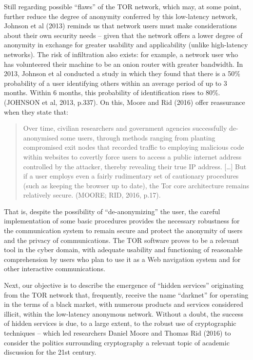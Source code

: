 Still regarding possible ``flaws'' of the TOR network, which may, at some point, further reduce the degree of anonymity conferred by this low-latency network, Johnson et al (2013) reminds us that network users must make considerations about their own security needs -- given that the network offers a lower degree of anonymity in exchange for greater usability and applicability (unlike high-latency networks). The risk of infiltration also exists: for example, a network user who has volunteered their machine to be an onion router with greater bandwidth. In 2013, Johnson et al conducted a study in which they found that there is a 50\% probability of a user identifying others within an average period of up to 3 months. Within 6 months, this probability of identification rises to 80\%. (JOHNSON et al, 2013, p.337). On this, Moore and Rid (2016) offer reassurance when they state that:

\begin{quote}
Over time, civilian researchers and government agencies successfully de-anonymised some users, through methods ranging from planting compromised exit nodes that recorded traffic to employing malicious code within websites to covertly force users to access a public internet address controlled by the attacker, thereby revealing their true IP address. {[}\ldots{]} But if a user employs even a fairly rudimentary set of cautionary procedures (such as keeping the browser up to date), the Tor core architecture remains relatively secure. (MOORE; RID, 2016, p.17).
\end{quote}

That is, despite the possibility of ``de-anonymizing'' the user, the careful implementation of some basic procedures provides the necessary robustness for the communication system to remain secure and protect the anonymity of users and the privacy of communications. The TOR software proves to be a relevant tool in the cyber domain, with adequate usability and functioning of reasonable comprehension by users who plan to use it as a Web navigation system and for other interactive communications.

Next, our objective is to describe the emergence of ``hidden services'' originating from the TOR network that, frequently, receive the name ``darknet'' for operating in the terms of a black market, with numerous products and services considered illicit, within the low-latency anonymous network. Without a doubt, the success of hidden services is due, to a large extent, to the robust use of cryptographic techniques -- which led researchers Daniel Moore and Thomas Rid (2016) to consider the politics surrounding cryptography a relevant topic of academic discussion for the 21st century.

